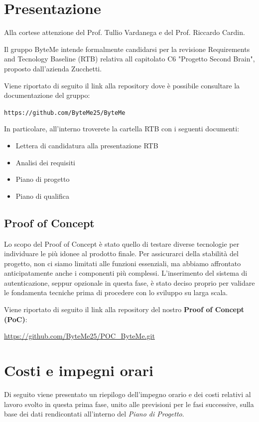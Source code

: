 \documentclass[11pt,a4paper]{article}
\begin{document}
\setcounter{page}{1}

\section{Presentazione}
Alla cortese attenzione del Prof. Tullio Vardanega e del Prof. Riccardo Cardin.

Il gruppo ByteMe intende formalmente candidarsi per la revisione Requirements and Tecnology Baseline (RTB) relativa all capitolato C6 "Progetto Second Brain", proposto dall'azienda Zucchetti.

Viene riportato di seguito il link alla repository dove è possibile consultare la documentazione del gruppo:
\begin{center}
\texttt{https://github.com/ByteMe25/ByteMe}
\end{center}

\noindent In particolare, all'interno troverete la cartella RTB con i seguenti documenti:
\begin{itemize}
    \item Lettera di candidatura alla presentazione RTB
    \item Analisi dei requisiti
    \item Piano di progetto
    \item Piano di qualifica
\end{itemize}


\subsection{Proof of Concept}
Lo scopo del Proof of Concept è stato quello di testare diverse tecnologie per individuare le più idonee al prodotto finale. Per assicurarci della stabilità del progetto, non ci siamo limitati alle funzioni essenziali, ma abbiamo affrontato anticipatamente anche i componenti più complessi. L'inserimento del sistema di autenticazione, seppur opzionale in questa fase, è stato deciso proprio per validare le fondamenta tecniche prima di procedere con lo sviluppo su larga scala.

Viene riportato di seguito il link alla repository del nostro \textbf{Proof of Concept (PoC)}:
\begin{center}
\url{https://github.com/ByteMe25/POC_ByteMe.git}
\end{center}

\newpage
\section{Costi e impegni orari}
Di seguito viene presentato un riepilogo dell'impegno orario e dei costi relativi al lavoro svolto in questa prima fase, unito alle previsioni per le fasi successive, sulla base dei dati rendicontati all'interno del \textit{Piano di Progetto}.
\end{document}
